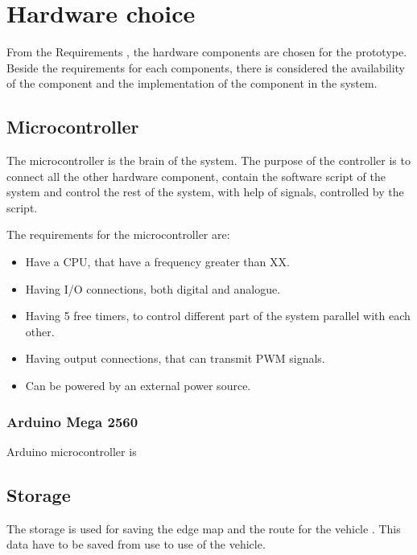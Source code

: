 \section{Hardware choice} \label{Hardwarechoice}
From the Requirements , the hardware components are chosen for the prototype. Beside the requirements for each components, there is considered the availability of the component and the implementation of the component in the system.


\subsection{Microcontroller}
The microcontroller is the brain of the system. The purpose of the controller is to connect all the other hardware component, contain the software script of the system and control the rest of the system, with help of signals, controlled by the script.

The requirements for the microcontroller are:
\begin{itemize}
\item Have a CPU, that have a frequency greater than XX. 
\item Having I/O connections, both digital and analogue.
\item Having 5 free timers, to control different part of the system parallel with each other.
\item Having output connections, that can transmit PWM signals.
\item Can be powered by an external power source.
\end{itemize} 

\subsubsection{Arduino Mega 2560}
Arduino microcontroller is 



\subsection{Storage}
The storage is used for saving the edge map and the route for the vehicle . This data have to be saved from use to use of the vehicle. 

